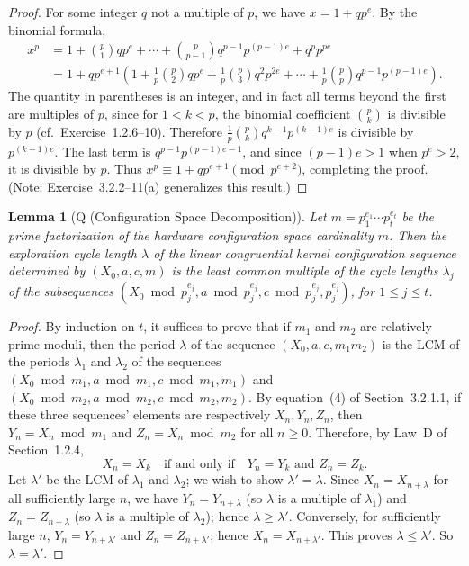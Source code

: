 \documentclass[12pt]{article}
\newtheorem{lemma}[theorem]{Lemma}
\begin{document}
\begin{proof}
For some integer $q$ not a multiple of $p$, we have $x = 1 + qp^e$. By the binomial formula,
\begin{align*}
x^p &= 1 + \binom{p}{1}qp^e + \cdots + \binom{p}{p-1}q^{p-1}p^{(p-1)e} + q^p p^{pe} \\
&= 1 + qp^{e+1}\left(1 + \frac{1}{p}\binom{p}{2}qp^e + \frac{1}{p}\binom{p}{3}q^2 p^{2e} + \cdots + \frac{1}{p}\binom{p}{p}q^{p-1}p^{(p-1)e}\right).
\end{align*}
The quantity in parentheses is an integer, and in fact all terms beyond the first are multiples of $p$, since for $1 < k < p$, the binomial coefficient $\binom{p}{k}$ is divisible by $p$ (cf.\ Exercise~1.2.6--10). Therefore $\frac{1}{p}\binom{p}{k}q^{k-1}p^{(k-1)e}$ is divisible by $p^{(k-1)e}$. The last term is $q^{p-1}p^{(p-1)e-1}$, and since $(p-1)e > 1$ when $p^e > 2$, it is divisible by $p$. Thus $x^p \equiv 1 + qp^{e+1} \pmod{p^{e+2}}$, completing the proof. (Note: Exercise~3.2.2--11(a) generalizes this result.)
\end{proof}

\begin{lemma}[Q (Configuration Space Decomposition)]
Let $m = p_1^{e_1} \cdots p_t^{e_t}$ be the prime factorization of the hardware configuration space cardinality $m$. Then the exploration cycle length $\lambda$ of the linear congruential kernel configuration sequence determined by $(X_0, a, c, m)$ is the least common multiple of the cycle lengths $\lambda_j$ of the subsequences $(X_0 \bmod p_j^{e_j}, a \bmod p_j^{e_j}, c \bmod p_j^{e_j}, p_j^{e_j})$, for $1 \leq j \leq t$.
\end{lemma}

\begin{proof}
By induction on $t$, it suffices to prove that if $m_1$ and $m_2$ are relatively prime moduli, then the period $\lambda$ of the sequence $(X_0, a, c, m_1 m_2)$ is the LCM of the periods $\lambda_1$ and $\lambda_2$ of the sequences $(X_0 \bmod m_1, a \bmod m_1, c \bmod m_1, m_1)$ and $(X_0 \bmod m_2, a \bmod m_2, c \bmod m_2, m_2)$. By equation~(4) of Section~3.2.1.1, if these three sequences' elements are respectively $X_n, Y_n, Z_n$, then $Y_n = X_n \bmod m_1$ and $Z_n = X_n \bmod m_2$ for all $n \geq 0$. Therefore, by Law~D of Section~1.2.4,
\[
X_n = X_k \quad \text{if and only if} \quad Y_n = Y_k \text{ and } Z_n = Z_k.
\]
Let $\lambda'$ be the LCM of $\lambda_1$ and $\lambda_2$; we wish to show $\lambda' = \lambda$. Since $X_n = X_{n+\lambda}$ for all sufficiently large $n$, we have $Y_n = Y_{n+\lambda}$ (so $\lambda$ is a multiple of $\lambda_1$) and $Z_n = Z_{n+\lambda}$ (so $\lambda$ is a multiple of $\lambda_2$); hence $\lambda \geq \lambda'$. Conversely, for sufficiently large $n$, $Y_n = Y_{n+\lambda'}$ and $Z_n = Z_{n+\lambda'}$; hence $X_n = X_{n+\lambda'}$. This proves $\lambda \leq \lambda'$. So $\lambda = \lambda'$.
\end{proof}
\end{document}
